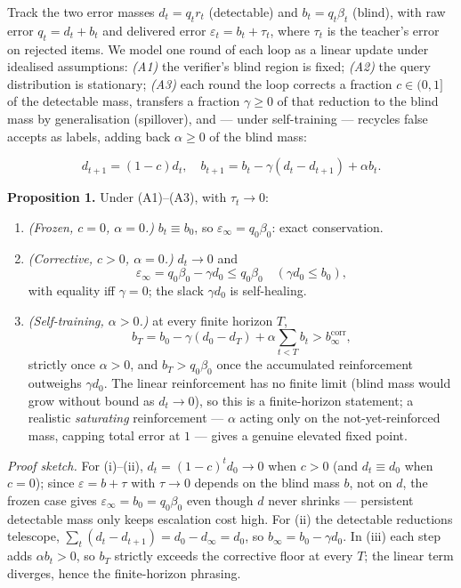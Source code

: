 \documentclass[11pt]{article}
\begin{document}
Track the two error masses \(d_{t} = q_{t}r_{t}\) (detectable) and
\(b_{t} = q_{t}\beta_{t}\) (blind), with raw error
\(q_{t} = d_{t} + b_{t}\) and delivered error
\(\varepsilon_{t} = b_{t} + \tau_{t}\), where \(\tau_{t}\) is the
teacher's error on rejected items. We model one round of each loop as a
linear update under idealised assumptions: \emph{(A1)} the verifier's
blind region is fixed; \emph{(A2)} the query distribution is stationary;
\emph{(A3)} each round the loop corrects a fraction
\(c \in (0,1\rbrack\) of the detectable mass, transfers a fraction
\(\gamma \geq 0\) of that reduction to the blind mass by generalisation
(spillover), and --- under self-training --- recycles false accepts as
labels, adding back \(\alpha \geq 0\) of the blind mass:

\[d_{t + 1} = (1 - c)d_{t},\quad b_{t + 1} = b_{t} - \gamma\left( d_{t} - d_{t + 1} \right) + \alpha b_{t}.\]

\textbf{Proposition 1.} Under (A1)--(A3), with
\(\tau_{t} \rightarrow 0\):

\begin{enumerate}
\item
  \emph{(Frozen, \(c = 0\), \(\alpha = 0\).)} \(b_{t} \equiv b_{0}\), so
  \(\varepsilon_{\infty} = q_{0}\beta_{0}\): exact conservation.
\item
  \emph{(Corrective, \(c > 0\), \(\alpha = 0\).)}
  \(d_{t} \rightarrow 0\) and
  \[\varepsilon_{\infty} = q_{0}\beta_{0} - \gamma d_{0} \leq q_{0}\beta_{0}\quad\left( \gamma d_{0} \leq b_{0} \right),\]
  with equality iff \(\gamma = 0\); the slack \(\gamma d_{0}\) is
  self-healing.
\item
  \emph{(Self-training, \(\alpha > 0\).)} at every finite horizon \(T\),
  \[b_{T} = b_{0} - \gamma\left( d_{0} - d_{T} \right) + \alpha\sum_{t < T}b_{t} > b_{\infty}^{\text{corr}},\]
  strictly once \(\alpha > 0\), and \(b_{T} > q_{0}\beta_{0}\) once the
  accumulated reinforcement outweighs \(\gamma d_{0}\). The linear
  reinforcement has no finite limit (blind mass would grow without bound
  as \(d_{t} \rightarrow 0\)), so this is a finite-horizon statement; a
  realistic \emph{saturating} reinforcement --- \(\alpha\) acting only
  on the not-yet-reinforced mass, capping total error at \(1\) --- gives
  a genuine elevated fixed point.
\end{enumerate}

\emph{Proof sketch.} For (i)--(ii),
\(d_{t} = (1 - c)^{t}d_{0} \rightarrow 0\) when \(c > 0\) (and
\(d_{t} \equiv d_{0}\) when \(c = 0\)); since \(\varepsilon = b + \tau\)
with \(\tau \rightarrow 0\) depends on the blind mass \(b\), not on
\(d\), the frozen case gives
\(\varepsilon_{\infty} = b_{0} = q_{0}\beta_{0}\) even though \(d\)
never shrinks --- persistent detectable mass only keeps escalation cost
high. For (ii) the detectable reductions telescope,
\(\sum_{t}\left( d_{t} - d_{t + 1} \right) = d_{0} - d_{\infty} = d_{0}\),
so \(b_{\infty} = b_{0} - \gamma d_{0}\). In (iii) each step adds
\(\alpha b_{t} > 0\), so \(b_{T}\) strictly exceeds the corrective floor
at every \(T\); the linear term diverges, hence the finite-horizon
phrasing.
\end{document}
